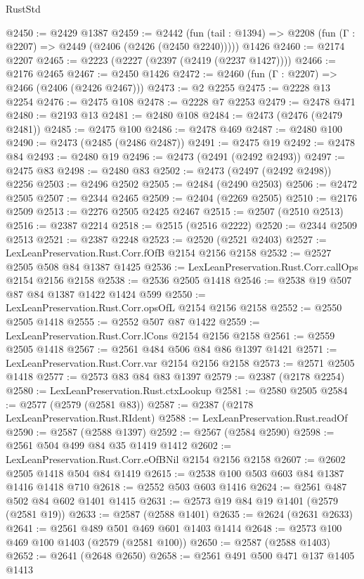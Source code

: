 \begin{lexlean}{RustStd}
\begin{coremodule}
{\begin{coremodule}
{{{{{{{{{{@2450 := @2429 @1387
@2459 := @2442
    (fun (tail : @1394) => @2208 (fun (Γ : @2207) => @2449 (@2406 (@2426 (@2450 @2240)))))
    @1426
@2460 := @2174 @2207
@2465 := @2223 (@2227 (@2397 (@2419 (@2237 @1427))))
@2466 := @2176 @2465
@2467 := @2450 @1426
@2472 := @2460 (fun (Γ : @2207) => @2466 (@2406 (@2426 @2467)))
@2473 := @2 @2255
@2475 := @2228 @13 @2254
@2476 := @2475 @108
@2478 := @2228 @7 @2253
@2479 := @2478 @471
@2480 := @2193 @13
@2481 := @2480 @108
@2484 := @2473 (@2476 (@2479 @2481))
@2485 := @2475 @100
@2486 := @2478 @469
@2487 := @2480 @100
@2490 := @2473 (@2485 (@2486 @2487))
@2491 := @2475 @19
@2492 := @2478 @84
@2493 := @2480 @19
@2496 := @2473 (@2491 (@2492 @2493))
@2497 := @2475 @83
@2498 := @2480 @83
@2502 := @2473 (@2497 (@2492 @2498)) @2256
@2503 := @2496 @2502
@2505 := @2484 (@2490 @2503)
@2506 := @2472 @2505
@2507 := @2344 @2465
@2509 := @2404 (@2269 @2505)
@2510 := @2176 @2509
@2513 := @2276 @2505 @2425 @2467
@2515 := @2507 (@2510 @2513)
@2516 := @2387 @2214
@2518 := @2515 (@2516 @2222)
@2520 := @2344 @2509 @2513
@2521 := @2387 @2248
@2523 := @2520 (@2521 @2403)
@2527 := LexLeanPreservation.Rust.Corr.fOfB @2154 @2156 @2158
@2532 := @2527 @2505 @508 @84 @1387 @1425
@2536 := LexLeanPreservation.Rust.Corr.callOps @2154 @2156 @2158
@2538 := @2536 @2505 @1418
@2546 := @2538 @19 @507 @87 @84 @1387 @1422 @1424 @599
@2550 := LexLeanPreservation.Rust.Corr.opsOfL @2154 @2156 @2158
@2552 := @2550 @2505 @1418
@2555 := @2552 @507 @87 @1422
@2559 := LexLeanPreservation.Rust.Corr.lCons @2154 @2156 @2158
@2561 := @2559 @2505 @1418
@2567 := @2561 @484 @506 @84 @86 @1397 @1421
@2571 := LexLeanPreservation.Rust.Corr.var @2154 @2156 @2158
@2573 := @2571 @2505 @1418
@2577 := @2573 @83 @84 @83 @1397
@2579 := @2387 (@2178 @2254)
@2580 := LexLeanPreservation.Rust.ctxLookup
@2581 := @2580 @2505
@2584 := @2577 (@2579 (@2581 @83))
@2587 := @2387 (@2178 LexLeanPreservation.Rust.RIdent)
@2588 := LexLeanPreservation.Rust.readOf
@2590 := @2587 (@2588 @1397)
@2592 := @2567 (@2584 @2590)
@2598 := @2561 @504 @499 @84 @35 @1419 @1412
@2602 := LexLeanPreservation.Rust.Corr.eOfBNil @2154 @2156 @2158
@2607 := @2602 @2505 @1418 @504 @84 @1419
@2615 := @2538 @100 @503 @603 @84 @1387 @1416 @1418 @710
@2618 := @2552 @503 @603 @1416
@2624 := @2561 @487 @502 @84 @602 @1401 @1415
@2631 := @2573 @19 @84 @19 @1401 (@2579 (@2581 @19))
@2633 := @2587 (@2588 @1401)
@2635 := @2624 (@2631 @2633)
@2641 := @2561 @489 @501 @469 @601 @1403 @1414
@2648 := @2573 @100 @469 @100 @1403 (@2579 (@2581 @100))
@2650 := @2587 (@2588 @1403)
@2652 := @2641 (@2648 @2650)
@2658 := @2561 @491 @500 @471 @137 @1405 @1413
}}}}}}}}}}
\end{coremodule}}
\end{coremodule}
\end{lexlean}
